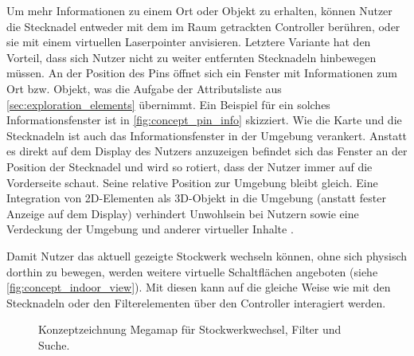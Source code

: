 Um mehr Informationen zu einem Ort oder Objekt zu erhalten, können Nutzer die Stecknadel entweder mit dem im Raum getrackten Controller berühren, oder sie mit einem virtuellen Laserpointer anvisieren.
Letztere Variante hat den Vorteil, dass sich Nutzer nicht zu weiter entfernten Stecknadeln hinbewegen müssen.
An der Position des Pins öffnet sich ein Fenster mit Informationen zum Ort bzw. Objekt, was die Aufgabe der Attributsliste aus \autoref{sec:exploration_elements} übernimmt.
Ein Beispiel für ein solches Informationsfenster ist in \autoref{fig:concept_pin_info} skizziert.
Wie die Karte und die Stecknadeln ist auch das Informationsfenster in der Umgebung verankert.
Anstatt es direkt auf dem Display des Nutzers anzuzeigen befindet sich das Fenster an der Position der Stecknadel und wird so rotiert, dass der Nutzer immer auf die Vorderseite schaut.
Seine relative Position zur Umgebung bleibt gleich.
Eine Integration von 2D-Elementen als 3D-Objekt in die Umgebung (anstatt fester Anzeige auf dem Display) verhindert Unwohlsein bei Nutzern sowie eine Verdeckung der Umgebung und anderer virtueller Inhalte \parencite[23]{Schroeder2017}.

Damit Nutzer das aktuell gezeigte Stockwerk wechseln können, ohne sich physisch dorthin zu bewegen, werden weitere virtuelle Schaltflächen angeboten (siehe \autoref{fig:concept_indoor_view}).
Mit diesen kann auf die gleiche Weise wie mit den Stecknadeln oder den Filterelementen über den Controller interagiert werden.


\begin{figure}[t]
	\centering
	\caption{Konzeptzeichnung Megamap für Stockwerkwechsel, Filter und Suche.}
	\label{fig:concept_indoor_view}
\end{figure}


